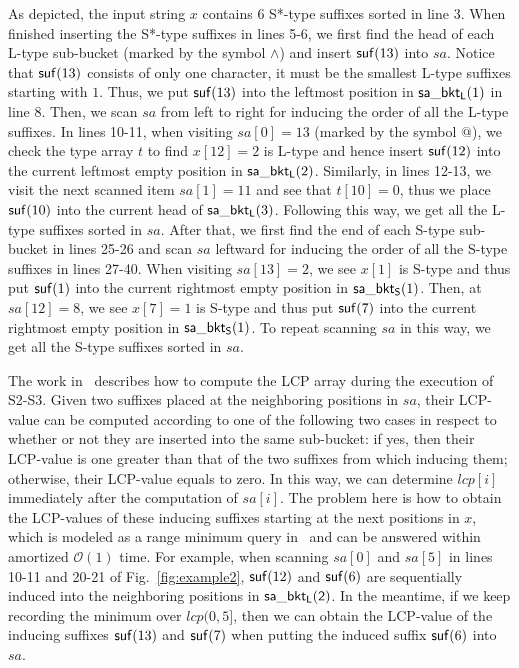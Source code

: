 \documentclass[10pt,journal,compsoc]{IEEEtran}
\begin{document}
As depicted, the input string $x$ contains 6 S*-type suffixes sorted in line 3. When finished inserting the S*-type suffixes in lines 5-6, we first find the head of each L-type sub-bucket (marked by the symbol $\wedge$) and insert ${\sf suf}(13)$ into $sa$. Notice that ${\sf suf}(13)$ consists of only one character, it must be the smallest L-type suffixes starting with $1$. Thus, we put ${\sf suf}(13)$ into the leftmost position in ${\sf sa\_bkt_L}(1)$ in line 8. Then, we scan $sa$ from left to right for inducing the order of all the L-type suffixes. In lines 10-11, when visiting $sa[0] = 13$ (marked by the symbol $@$), we check the type array $t$ to find $x[12] = 2$ is L-type and hence insert ${\sf suf}(12)$ into the current leftmost empty position in ${\sf sa\_bkt_L}(2)$. Similarly, in lines 12-13, we visit the next scanned item $sa[1] = 11$ and see that $t[10] = 0$, thus we place ${\sf suf}(10)$ into the current head of ${\sf sa\_bkt_L}(3)$. Following this way, we get all the L-type suffixes sorted in $sa$. After that, we first find the end of each S-type sub-bucket in lines 25-26 and scan $sa$ leftward for inducing the order of all the S-type suffixes in lines 27-40. When visiting $sa[13] = 2$, we see $x[1]$ is S-type and thus put ${\sf suf}(1)$ into the current rightmost empty position in ${\sf sa\_bkt_S}(1)$. Then, at $sa[12] = 8$, we see $x[7] = 1$ is S-type and thus put ${\sf suf}(7)$ into the current rightmost empty position in ${\sf sa\_bkt_S}(1)$. To repeat scanning $sa$ in this way, we get all the S-type suffixes sorted in $sa$. 

The work in~\cite{Fischer11} describes how to compute the LCP array during the execution of S2-S3. Given two suffixes placed at the neighboring positions in $sa$, their LCP-value can be computed according to one of the following two cases in respect to whether or not they are inserted into the same sub-bucket: if yes, then their LCP-value is one greater than that of the two suffixes from which inducing them; otherwise, their LCP-value equals to zero. In this way, we can determine $lcp[i]$ immediately after the computation of $sa[i]$. The problem here is how to obtain the LCP-values of these inducing suffixes starting at the next positions in $x$, which is modeled as a range minimum query in~\cite{Fischer11} and can be answered within amortized $\mathcal{O}(1)$ time. For example, when scanning $sa[0]$ and $sa[5]$ in lines 10-11 and 20-21 of Fig.~\ref{fig:example2}, ${\sf suf}(12)$ and ${\sf suf}(6)$ are sequentially induced into the neighboring positions in ${\sf sa\_bkt_L(2)}$. In the meantime, if we keep recording the minimum over $lcp(0, 5]$, then we can obtain the LCP-value of the inducing suffixes ${\sf suf}(13)$ and ${\sf suf}(7)$ when putting the induced suffix ${\sf suf}(6)$ into $sa$.
\end{document}

